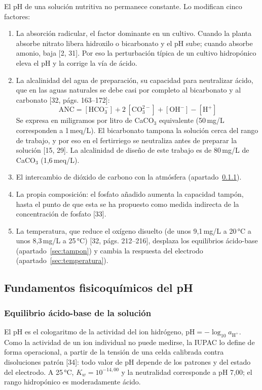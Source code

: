 El pH de una solución nutritiva no permanece constante. Lo modifican cinco factores:
\begin{enumerate}
\item La absorción radicular, el factor dominante en un cultivo. Cuando la planta absorbe nitrato libera hidroxilo o bicarbonato y el pH sube; cuando absorbe amonio, baja [2, 31]. Por eso la perturbación típica de un cultivo hidropónico eleva el pH y la corrige la vía de ácido.
\item La alcalinidad del agua de preparación, su capacidad para neutralizar ácido, que en las aguas naturales se debe casi por completo al bicarbonato y al carbonato [32, págs. 163–172]:
\begin{equation}
\mathrm{ANC}=[\mathrm{HCO_3^-}]+2\,[\mathrm{CO_3^{2-}}]+[\mathrm{OH^-}]-[\mathrm{H^+}]\label{eq:anc}
\end{equation}
Se expresa en miligramos por litro de CaCO$_3$ equivalente (50\,mg/L corresponden a 1\,meq/L). El bicarbonato tampona la solución cerca del rango de trabajo, y por eso en el fertirriego se neutraliza antes de preparar la solución [15, 29]. La alcalinidad de diseño de este trabajo es de 80\,mg/L de CaCO$_3$ (1,6\,meq/L).
\item El intercambio de dióxido de carbono con la atmósfera (apartado~\ref{sec:equilibrio}).
\item La propia composición: el fosfato añadido aumenta la capacidad tampón, hasta el punto de que esta se ha propuesto como medida indirecta de la concentración de fosfato [33].
\item La temperatura, que reduce el oxígeno disuelto (de unos 9,1\,mg/L a 20\,°C a unos 8,3\,mg/L a 25\,°C) [32, págs. 212–216], desplaza los equilibrios ácido-base (apartado~\ref{sec:tampon}) y cambia la respuesta del electrodo (apartado~\ref{sec:temperatura}).
\end{enumerate}

\subsection{Fundamentos fisicoquímicos del pH}\label{sec:quimica}

\subsubsection{Equilibrio ácido-base de la solución}\label{sec:equilibrio}
El pH es el cologaritmo de la actividad del ion hidrógeno, $\mathrm{pH}=-\log_{10}a_{\mathrm{H^+}}$. Como la actividad de un ion individual no puede medirse, la IUPAC lo define de forma operacional, a partir de la tensión de una celda calibrada contra disoluciones patrón [34]: todo valor de pH depende de los patrones y del estado del electrodo. A 25\,°C, $K_w=10^{-14{,}00}$ y la neutralidad corresponde a pH 7,00; el rango hidropónico es moderadamente ácido.

